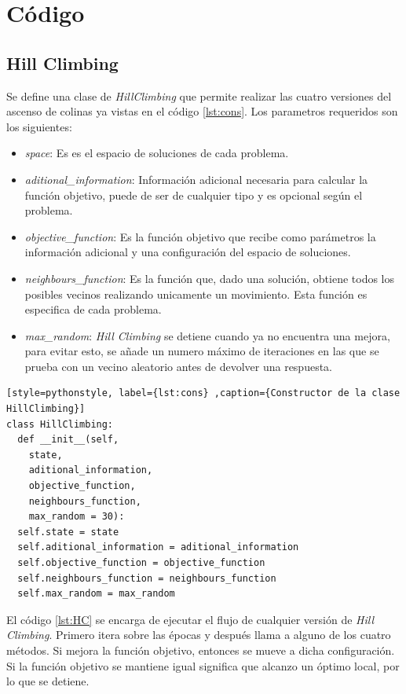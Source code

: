 \documentclass[12pt,twoside]{article}
\begin{document}
\clearpage
\section{Código}

\subsection{Hill Climbing}

Se define una clase de \textit{HillClimbing} que permite realizar las cuatro versiones del ascenso de colinas ya vistas en el código \ref{lst:cons}. Los parametros requeridos son los siguientes:
\begin{itemize}
	\item \textit{space}: Es es el espacio de soluciones de cada problema.
	\item \textit{aditional\_information}: Información adicional necesaria para calcular la función objetivo, puede de ser de cualquier tipo y es opcional según el problema.
	\item \textit{objective\_function}: Es la función objetivo que recibe como parámetros la información adicional y una configuración del espacio de soluciones.
	\item \textit{neighbours\_function}: Es la función que, dado una solución, obtiene todos los posibles vecinos realizando unicamente un movimiento. Esta función es especifica de cada problema.
	\item \textit{max\_random}: \textit{Hill Climbing} se detiene cuando ya no encuentra una mejora, para evitar esto, se añade un numero máximo de iteraciones en las que se prueba con un vecino aleatorio antes de devolver una respuesta. 
\end{itemize}

\begin{lstlisting}[style=pythonstyle, label={lst:cons} ,caption={Constructor de la clase HillClimbing}]
class HillClimbing:
  def __init__(self, 
    state, 
    aditional_information, 
    objective_function, 
    neighbours_function, 
    max_random = 30):
  self.state = state
  self.aditional_information = aditional_information
  self.objective_function = objective_function
  self.neighbours_function = neighbours_function
  self.max_random = max_random
\end{lstlisting}

El código \ref{lst:HC} se encarga de ejecutar el flujo de cualquier versión de \textit{Hill Climbing}. Primero itera sobre las épocas y después llama a alguno de los cuatro métodos. Si mejora la función objetivo, entonces se mueve a dicha configuración. Si la función objetivo se mantiene igual significa que alcanzo un óptimo local, por lo que se detiene.
\end{document}
